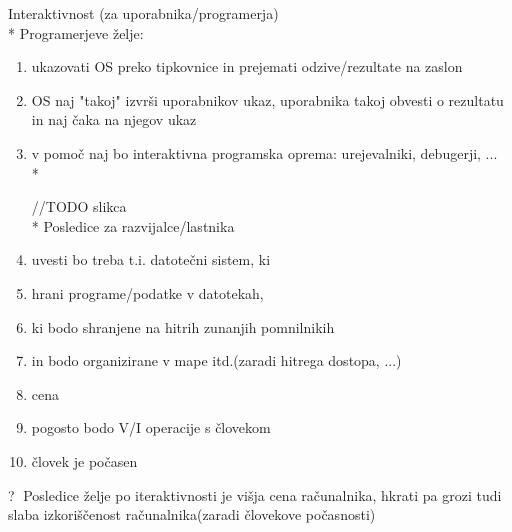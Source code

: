 \documentclass{article}
\begin{document}
Interaktivnost (za uporabnika/programerja)\\*
Programerjeve želje:
\begin{enumerate}
  \item ukazovati OS preko tipkovnice in prejemati odzive/rezultate na zaslon
  \item OS naj "takoj" izvrši uporabnikov ukaz, uporabnika takoj obvesti o rezultatu in naj čaka na njegov ukaz
  \item v pomoč naj bo interaktivna programska oprema: urejevalniki, debugerji, ...\\*

//TODO slikca\\*
Posledice za razvijalce/lastnika
  \item uvesti bo treba t.i. datotečni sistem, ki
  	\item hrani programe/podatke v datotekah,
  	\item ki bodo shranjene na hitrih zunanjih pomnilnikih
	\item in bodo organizirane v mape itd.(zaradi hitrega dostopa, ...)
  \item cena
  \item pogosto bodo V/I operacije s človekom
  \item človek je počasen
\end{enumerate}

\textcircled{?} Posledice želje po iteraktivnosti je višja cena računalnika, hkrati pa grozi tudi slaba izkoriščenost računalnika(zaradi človekove počasnosti)
\end{document}
